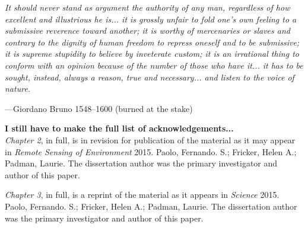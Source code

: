 \begin{frontmatter}
\begin{myepigraph} %
  \vfil
  \centering
  \begin{minipage}{.75\textwidth}
    {\justify
    \emph{
    It should never stand as argument the authority of any man, regardless of how excellent and illustrious he is... it is grossly unfair to fold one's own feeling to a submissive reverence toward another; it is worthy of mercenaries or slaves and contrary to the dignity of human freedom to repress oneself and to be submissive; it is supreme stupidity to believe by inveterate custom; it is an irrational thing to conform with an opinion because of the number of those who have it... it has to be sought, instead, always a reason, true and necessary... and listen to the voice of nature.
    }
    }
    \begin{flushright}
    ---Giordano Bruno 1548--1600 (burned at the stake)
    \end{flushright}
  \end{minipage}
  \vfil
\end{myepigraph}


%
\setcounter{tocdepth}{1}
\tableofcontents
\listoffigures  %
\listoftables   %



%
%
\begin{acknowledgements} 

{\bf I still have to make the full list of acknowledgements...}\\[.1cm]

{\sl Chapter 2}, in full, is in revision for publication of the material as it
may appear in {\it Remote Sensing of Environment} 2015. Paolo, Fernando. S.;
Fricker, Helen A.; Padman, Laurie. The dissertation author was the primary
investigator and author of this paper.

{\sl Chapter 3}, in full, is a reprint of the material as it appears in {\it Science}
2015. Paolo, Fernando. S.; Fricker, Helen A.; Padman, Laurie. The dissertation
author was the primary investigator and author of this paper.


\end{acknowledgements}
\end{frontmatter}
